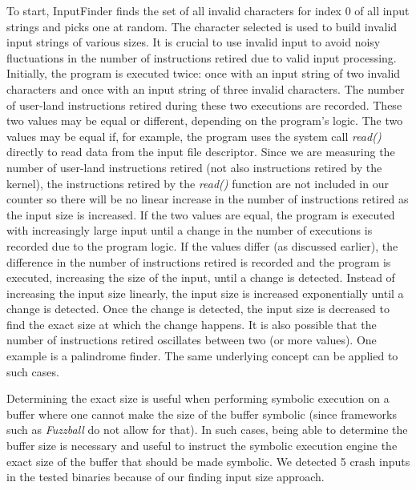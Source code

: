 \documentclass{acm_proc_article-sp}
\def \tool {InputFinder}
\begin{document}
To start, \tool{} finds the set of all invalid characters for index 0 of all input strings and picks one at random.
The character selected is used to build invalid input strings of various sizes.
It is crucial to use invalid input to avoid noisy fluctuations in the number of instructions retired due to valid input processing.
Initially, the program is executed twice: once with an input string of two invalid characters and once with an input string of three invalid characters.
The number of user-land instructions retired during these two executions are recorded.
These two values may be equal or different, depending on the program's logic.
The two values may be equal if, for example, the program uses the system call \textit{read()} directly to read data from the input file descriptor.
Since we are measuring the number of user-land instructions retired (not also instructions retired by the kernel), the instructions retired by the \textit{read()} function are not included in our counter so there will be no linear increase in the number of instructions retired as the input size is increased.
If the two values are equal, the program is executed with increasingly large input until a change in the number of executions is recorded due to the program logic.
If the values differ (as discussed earlier), the difference in the number of instructions retired is recorded and the program is executed, increasing the size of the input, until a change is detected.
Instead of increasing the input size linearly, the input size is increased exponentially until a change is detected.
Once the change is detected, the input size is decreased to find the exact size at which the change happens.
It is also possible that the number of instructions retired oscillates between two (or more values).
One example is a palindrome finder.
The same underlying concept can be applied to such cases.

Determining the exact size is useful when performing symbolic execution on a buffer where one cannot make the size of the buffer symbolic (since frameworks such as \textit{Fuzzball} do not allow for that).
In such cases, being able to determine the buffer size is necessary and useful to instruct the symbolic execution engine the exact size of the buffer that should be made symbolic.
We detected 5 crash inputs in the tested binaries because of our finding input size approach.
\end{document}
